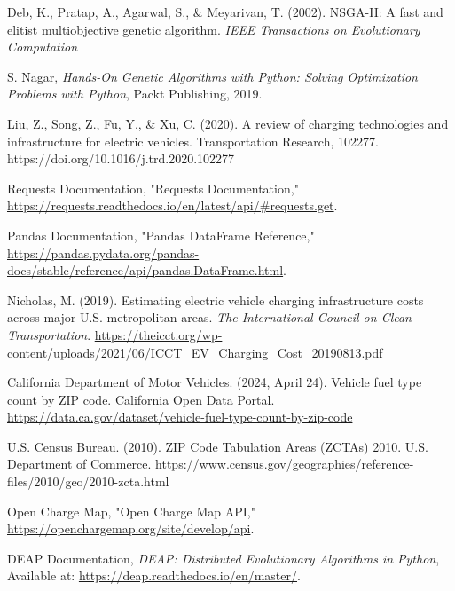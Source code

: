 \begin{thebibliography}{99}
     Deb, K., Pratap, A., Agarwal, S., \& Meyarivan, T. (2002). NSGA-II: A fast and elitist multiobjective genetic algorithm. \textit{IEEE Transactions on Evolutionary Computation}

    
     S. Nagar, \textit{Hands-On Genetic Algorithms with Python: Solving Optimization Problems with Python}, Packt Publishing, 2019.

    Liu, Z., Song, Z., Fu, Y., \& Xu, C. (2020). A review of charging technologies and infrastructure for electric vehicles. Transportation Research, 102277. https://doi.org/10.1016/j.trd.2020.102277

     Requests Documentation, "Requests Documentation,"  \url{https://requests.readthedocs.io/en/latest/api/\#requests.get}.
    
     Pandas Documentation, "Pandas DataFrame Reference," \url{https://pandas.pydata.org/pandas-docs/stable/reference/api/pandas.DataFrame.html}.

     Nicholas, M. (2019). Estimating electric vehicle charging infrastructure costs across major U.S. metropolitan areas. \textit{The International Council on Clean Transportation}. \url{https://theicct.org/wp-content/uploads/2021/06/ICCT_EV_Charging_Cost_20190813.pdf}

    California Department of Motor Vehicles. (2024, April 24). Vehicle fuel type count by ZIP code. California Open Data Portal.  \url{https://data.ca.gov/dataset/vehicle-fuel-type-count-by-zip-code}

     U.S. Census Bureau. (2010). ZIP Code Tabulation Areas (ZCTAs) 2010. U.S. Department of Commerce. https://www.census.gov/geographies/reference-files/2010/geo/2010-zcta.html




    
     Open Charge Map, "Open Charge Map API," \url{https://openchargemap.org/site/develop/api}.
      
    
    
    DEAP Documentation, \textit{DEAP: Distributed Evolutionary Algorithms in Python}, Available at: \url{https://deap.readthedocs.io/en/master/}.
    

\end{thebibliography}
